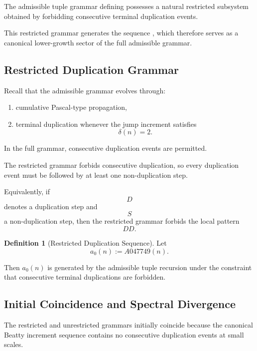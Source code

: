 \documentclass[12pt, oneside]{article}
\numberwithin{equation}{section}
\theoremstyle{definition}
\newtheorem{definition}{Definition}[section]
\theoremstyle{plain}
\theoremstyle{remark}
\begin{document}
The admissible tuple grammar defining  possesses a natural
restricted subsystem obtained by forbidding consecutive terminal
duplication events.

This restricted grammar generates the sequence , which
therefore serves as a canonical lower-growth sector of the full
admissible grammar.


\subsection{Restricted Duplication Grammar}

Recall that the admissible grammar evolves through:
\begin{enumerate}
\item cumulative Pascal-type propagation,
\item terminal duplication whenever the jump increment satisfies
\[
\delta(n)=2.
\]
\end{enumerate}

In the full grammar, consecutive duplication events are permitted.

The restricted grammar forbids consecutive duplication, so every
duplication event must be followed by at least one non-duplication step.

Equivalently, if
\[
D
\]
denotes a duplication step and
\[
S
\]
a non-duplication step, then the restricted grammar forbids the local
pattern
\[
DD.
\]


\begin{definition}[Restricted Duplication Sequence]
Let
\[
a_0(n):=A047749(n).
\]

Then \(a_0(n)\) is generated by the admissible tuple recursion under
the constraint that consecutive terminal duplications are forbidden.
\end{definition}


\subsection{Initial Coincidence and Spectral Divergence}

The restricted and unrestricted grammars initially coincide because the
canonical Beatty increment sequence contains no consecutive duplication
events at small scales.
\end{document}
